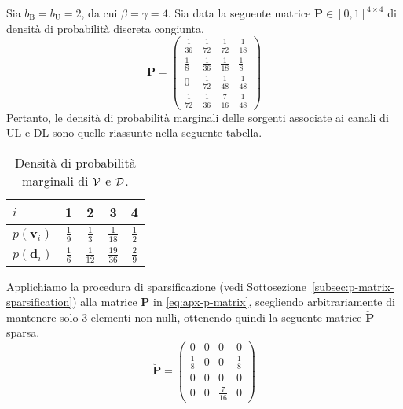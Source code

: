 Sia \(b_\mathrm{B} = b_\mathrm{U} = 2\), da cui \(\beta = \gamma = 4\). Sia
data la seguente matrice \(\bm{P} \in [0,1]^{4 \times 4}\) di densità di
probabilità discreta congiunta.
\begin{equation}
    \bm{P} =
    \begin{pmatrix}
        \frac{1}{36} & \frac{1}{72} & \frac{1}{72} & \frac{1}{18} \\
        \frac{1}{8}  & \frac{1}{36} & \frac{1}{18} & \frac{1}{8}  \\
             0       & \frac{1}{72} & \frac{1}{48} & \frac{1}{48} \\
        \frac{1}{72} & \frac{1}{36} & \frac{7}{16} & \frac{1}{48}
    \end{pmatrix} \label{eq:apx-p-matrix}
\end{equation}
Pertanto, le densità di probabilità marginali delle sorgenti associate ai
canali di UL e DL sono quelle riassunte nella seguente tabella.
\begin{table}[ht]
    \centering
    \renewcommand{\arraystretch}{1.4}
    \begin{tabular}{lcccc}
        \toprule
        \(i\) & 1 & 2 & 3 & 4 \\
        \midrule
        \(p(\bm{v}_i)\) & \(\frac{1}{9}\) & \(\frac{1}{3}\)  & \(\frac{1}{18}\)  & \(\frac{1}{2}\) \\
        \(p(\bm{d}_i)\) & \(\frac{1}{6}\) & \(\frac{1}{12}\) & \(\frac{19}{36}\) & \(\frac{2}{9}\) \\
        \bottomrule
    \end{tabular}
    \caption{Densità di probabilità marginali di $\mathcal{V}$ e $\mathcal{D}$.}
    \label{tab:apx-marginal-probability}
\end{table}
\newline
Applichiamo la procedura di sparsificazione (vedi
Sottosezione~\ref{subsec:p-matrix-sparsification}) alla matrice $\bm{P}$ in
\eqref{eq:apx-p-matrix}, scegliendo arbitrariamente di mantenere solo \(3\)
elementi non nulli, ottenendo quindi la seguente matrice \(\bm{\breve{P}}\)
sparsa.
\begin{equation}
    \bm{\breve{P}} =
    \begin{pmatrix}
             0       & 0 &      0       &      0       \\
        \frac{1}{8}  & 0 &      0       & \frac{1}{8}  \\
             0       & 0 &      0       &      0       \\
             0       & 0 & \frac{7}{16} &      0
    \end{pmatrix} \label{eq:apx-p-matrix-sparse}
\end{equation}
